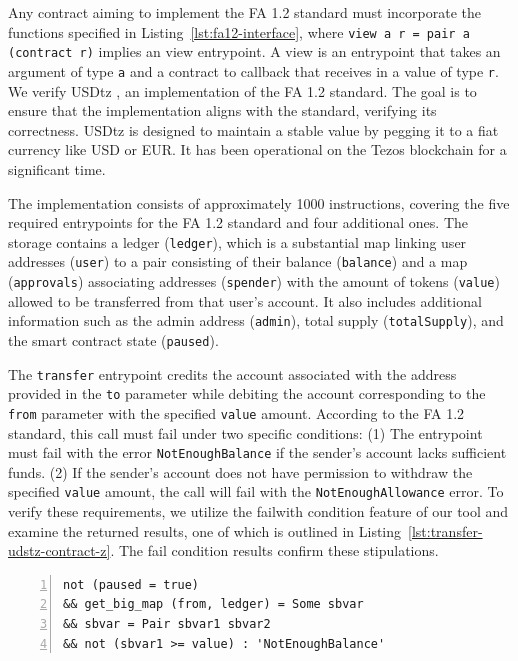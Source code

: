 \documentclass[runningheads]{llncs}
\begin{document}
Any contract aiming to implement the FA 1.2 standard must incorporate the functions specified in Listing~\ref{lst:fa12-interface}, where
\lstinline/view a r = pair a (contract r)/ implies an view entrypoint.
A view is an entrypoint that takes an argument of type \lstinline/a/ and a contract to callback that receives in a value of type \lstinline/r/. 
We verify USDtz \cite{usdtzimplemetation,tzstatsusdtz}, an implementation of the FA 1.2 standard. The goal is to ensure that the implementation aligns with the standard, verifying its correctness. USDtz is designed to maintain a stable value by pegging it to a fiat currency like USD or EUR. It has been operational on the Tezos blockchain for a significant time.

The implementation consists of approximately 1000 instructions, covering the five required entrypoints for the FA 1.2 standard and four additional ones. The storage contains a ledger (\lstinline/ledger/), which is a substantial map linking user addresses (\lstinline/user/) to a pair consisting of their balance (\lstinline/balance/) and a map (\lstinline/approvals/) associating addresses (\lstinline/spender/) with the amount of tokens (\lstinline/value/) allowed to be transferred from that user's account. It also includes additional information such as the admin address (\lstinline/admin/), total supply (\lstinline/totalSupply/), and the smart contract state (\lstinline/paused/).

The \lstinline/transfer/ entrypoint credits the account associated with the address provided in the \lstinline/to/ parameter while debiting the account corresponding to the \lstinline/from/ parameter with the specified \lstinline/value/ amount. According to the FA 1.2 standard, this call must fail under two specific conditions: (1) The entrypoint must fail with the error \lstinline/NotEnoughBalance/ if the sender's account lacks sufficient funds. (2) If the sender's account does not have permission to withdraw the specified \lstinline/value/ amount, the call will fail with the \lstinline/NotEnoughAllowance/ error. To verify these requirements, we utilize the failwith condition feature of our tool and examine the returned results, one of which is outlined in Listing~\ref{lst:transfer-udstz-contract-z}. The fail condition results confirm these stipulations.
\begin{lstlisting}[float,captionpos=b,caption={The \lstinline/NotEnoughBalance/ fail condition for the \lstinline/transfer/ entrypoint},label={lst:transfer-udstz-contract-z},numbers=left]
not (paused = true) 
&& get_big_map (from, ledger) = Some sbvar 
&& sbvar = Pair sbvar1 sbvar2 
&& not (sbvar1 >= value) : 'NotEnoughBalance'
\end{lstlisting}
\end{document}

